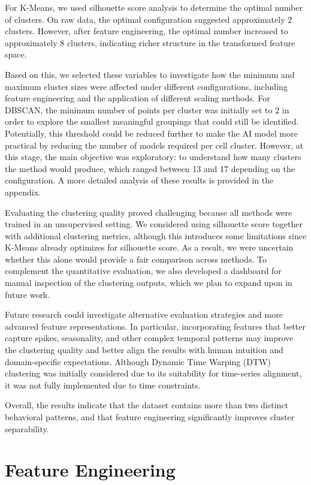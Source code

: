 \documentclass[conference]{IEEEtran}
\begin{document}
For K-Means, we used silhouette score analysis to determine the optimal number of clusters. On raw data, the optimal configuration suggested approximately 2 clusters. However, after feature engineering, the optimal number increased to approximately 8 clusters, indicating richer structure in the transformed feature space.

Based on this, we selected these variables to investigate how the minimum and maximum cluster sizes were affected under different configurations, including feature engineering and the application of different scaling methods. For DBSCAN, the minimum number of points per cluster was initially set to 2 in order to explore the smallest meaningful groupings that could still be identified. Potentially, this threshold could be reduced further to make the AI model more practical by reducing the number of models required per cell cluster. However, at this stage, the main objective was exploratory: to understand how many clusters the method would produce, which ranged between 13 and 17 depending on the configuration. A more detailed analysis of these results is provided in the appendix.

Evaluating the clustering quality proved challenging because all methods were trained in an unsupervised setting. We considered using silhouette score together with additional clustering metrics, although this introduces some limitations since K-Means already optimizes for silhouette score. As a result, we were uncertain whether this alone would provide a fair comparison across methods. To complement the quantitative evaluation, we also developed a dashboard for manual inspection of the clustering outputs, which we plan to expand upon in future work.

Future research could investigate alternative evaluation strategies and more advanced feature representations. In particular, incorporating features that better capture spikes, seasonality, and other complex temporal patterns may improve the clustering quality and better align the results with human intuition and domain-specific expectations.
Although Dynamic Time Warping (DTW) clustering was initially considered due to its suitability for time-series alignment, it was not fully implemented due to time constraints.

Overall, the results indicate that the dataset contains more than two distinct behavioral patterns, and that feature engineering significantly improves cluster separability.

\section{Feature Engineering}
\end{document}
